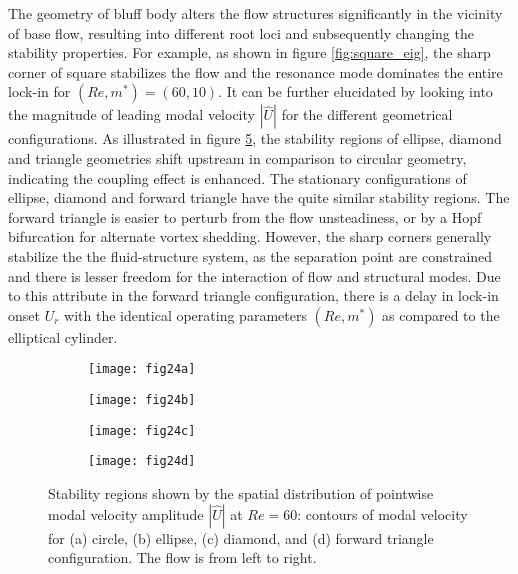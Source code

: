 \documentclass{jfm}
\begin{document}
The geometry of bluff body alters the flow structures significantly 
in the vicinity of base flow, 
resulting into different root loci and subsequently changing the stability properties. For example, as shown in figure \ref{fig:square_eig}, 
the sharp corner of square stabilizes the flow and the resonance mode dominates 
the entire lock-in for $(Re,m^*)=(60,10)$. 
%
It can be further elucidated by 
looking into the magnitude of leading modal velocity 
$|\widehat{U}|$ for the different geometrical configurations. 
As illustrated in figure \ref{fig:mode_topo}, the stability regions
of ellipse, diamond and triangle geometries shift upstream in comparison to  
circular geometry, indicating the coupling 
effect is enhanced. The stationary configurations of ellipse, diamond and forward triangle have 
the quite similar stability regions.  
%
The forward triangle is easier to perturb from the flow unsteadiness, 
or by a Hopf bifurcation 
for alternate vortex shedding. However, the sharp corners generally stabilize the 
the fluid-structure system, 
as the separation point are constrained and there is 
lesser freedom for the interaction of flow and structural modes. 
Due to this attribute in the forward triangle configuration, 
there is a delay in lock-in onset $U_r$ with the identical operating 
parameters $(Re,m^*)$ as compared to the elliptical cylinder.  

 
\begin{figure}
\centering
\begin{subfigure}{0.495\textwidth}
\centering
	 \texttt{[image: fig24a]}
    \caption{}
    \label{fig:ellipse_re60}
    \end{subfigure} 
\begin{subfigure}{0.495\textwidth} 
\centering
     \texttt{[image: fig24b]}
	\caption{}
	\label{fig:square_re60}
	\end{subfigure}	
\begin{subfigure}{0.495\textwidth} 
\centering
     \texttt{[image: fig24c]}
	\caption{}
	\label{fig:trian1_re60}
	\end{subfigure}	
\begin{subfigure}{0.495\textwidth} 
\centering
     \texttt{[image: fig24d]}
	\caption{}
	\label{fig:trian2_re60}
	\end{subfigure}	
     \caption{Stability regions shown by the spatial distribution of pointwise 
     modal velocity amplitude $|\widehat{U}|$ at $Re=60$: contours of modal velocity for
     (a) circle, (b) ellipse,
      (c) diamond, and (d) forward triangle configuration. 
       The flow is from left to right.}
\label{fig:mode_topo}
\end{figure} 
\end{document}

